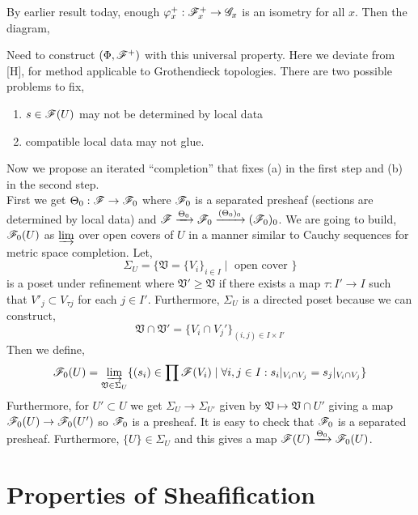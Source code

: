 \documentclass[12pt]{article}
\begin{document}
By earlier result today, enough $\varphi_x^+ : \mathscr{F}_x^+ \to \mathscr{G}_x$ is an isometry for all $x$. Then the diagram,
\begin{center}
\end{center}
Need to construct $(\Phi, \mathscr{F}^+)$ with this universal property. Here we deviate from [H], for method applicable to Grothendieck topologies. There are two possible problems to fix,
\begin{enumerate}
\item $s \in \mathscr{F}(U)$ may not be determined by local data
\item compatible local data may not glue.
\end{enumerate}
Now we propose an iterated ``completion'' that fixes (a) in the first step and (b) in the second step.
\bigskip
\\
First we get $\Theta_0 : \mathscr{F} \to \mathscr{F}_0$ where $\mathscr{F}_0$ is a separated presheaf (sections are determined by local data) and $\mathscr{F} \xrightarrow{\Theta_0} \mathscr{F}_0 \xrightarrow{(\Theta_0)_0} (\mathscr{F}_0)_0$.
We are going to build, $\mathscr{F}_0(U)$ as $\varinjlim$ over open covers of $U$ in a manner similar to Cauchy sequences for metric space completion. Let,
\[ \Sigma_U  = \{ \mathfrak{V} = \{ V_i \}_{i \in I} \mid \text{ open cover } \} \]
is a poset under refinement where $\mathfrak{V}' \ge \mathfrak{V}$ if there exists a map $\tau : I' \to I$ such that $V'_{j} \subset V_{\tau{j}}$ for each $j \in I'$. Furthermore, $\Sigma_U$ is a directed poset because we can construct,
\[ \mathfrak{V} \cap \mathfrak{V}' = \{ V_i \cap V_j' \}_{(i,j) \in I \times I'} \]
Then we define,
\[ \mathscr{F}_0(U) = \varinjlim_{\mathfrak{V} \in \Sigma_U} \{ (s_i) \in \prod \mathscr{F}(V_i) \mid \forall i,j \in I : s_i |_{V_i \cap V_j} = s_j |_{V_i \cap V_j} \} \]
Furthermore, for $U' \subset U$ we get $\Sigma_U \to \Sigma_{U'}$ given by $\mathfrak{V} \mapsto \mathfrak{V} \cap U'$ giving a map $\mathscr{F}_0(U) \to \mathscr{F}_0(U')$ so $\mathscr{F}_0$ is a presheaf. It is easy to check that $\mathscr{F}_0$ is a separated presheaf. Furthermore, $\{ U \} \in \Sigma_U$ and this gives a map $\mathscr{F}(U) \xrightarrow{\Theta_0} \mathscr{F}_0(U)$.

\section{Properties of Sheafification}
\end{document}
